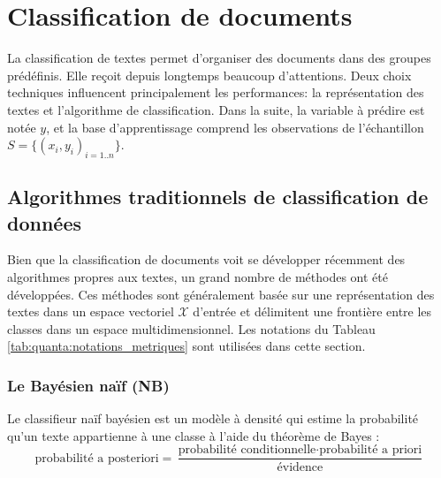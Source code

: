 \section{Classification de documents}
\label{sec:sensresultat:biblio_classif}

La classification de textes permet d'organiser des documents dans des groupes prédéfinis. Elle reçoit depuis longtemps beaucoup d'attentions. Deux choix techniques influencent principalement les performances: la représentation des textes et l'algorithme de classification. Dans la suite, la variable à prédire est notée $y$, et la base d'apprentissage comprend les observations de l'échantillon $S = \lbrace (x_i, y_i)_{i=1..n} \rbrace$.

\subsection{Algorithmes traditionnels de classification de données}
Bien que la classification de documents voit se développer récemment des algorithmes propres aux textes, un grand nombre de méthodes ont été développées. Ces méthodes sont généralement basée sur une représentation  des textes dans un espace vectoriel $\mathcal{X}$ d'entrée et délimitent une frontière entre les classes dans un espace multidimensionnel. Les notations du Tableau \ref{tab:quanta:notations_metriques} sont utilisées dans cette section. 

\subsubsection{Le Bayésien naïf (NB)}
Le classifieur naïf bayésien \citep{duda1973patternclass} est  un modèle à densité qui estime la probabilité qu'un texte appartienne à une classe à l'aide du théorème de Bayes \citep{raschka2014naivebayes}:
\begin{equation}
\text{probabilité a posteriori} = \frac{\text{probabilité conditionnelle} \cdot \text{probabilité a priori}}{\text{évidence}}
\end{equation}

